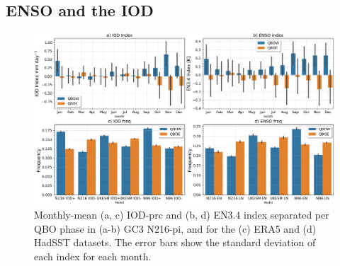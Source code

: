 %
%
%
%
%


\subsection{ENSO and the IOD}

\begin{figure}[t!]
\centering
 \noindent
 \includegraphics[width=\linewidth]{figures/iod_barplot.png}
\caption[IOD and ENSO frequency changes on QBO phase.]{ Monthly-mean (a, c) IOD-prc and (b, d) EN3.4 index separated per QBO phase in (a-b) GC3 N216-pi, and for the (c) ERA5 and (d) HadSST datasets. The error bars show the standard deviation of each index for each month.  }
\label{fig:iod_barplot}
\end{figure}

